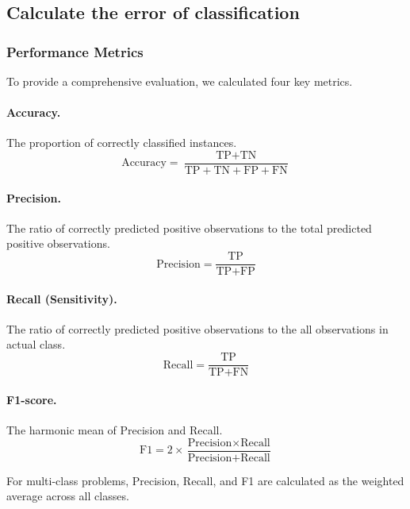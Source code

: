 \documentclass[12pt]{article}
\begin{document}
\subsection{Calculate the error of classification}

\subsubsection{Performance Metrics}
To provide a comprehensive evaluation, we calculated four key metrics.

\paragraph{Accuracy.} The proportion of correctly classified instances.
\begin{equation}
    \text{Accuracy} = \frac{\text{TP} + \text{TN}}{\text{TP} + \text{TN} + \text{FP} + \text{FN}}
\end{equation}

\paragraph{Precision.} The ratio of correctly predicted positive observations to the total predicted positive observations.
\begin{equation}
    \text{Precision} = \frac{\text{TP}}{\text{TP} + \text{FP}}
\end{equation}

\paragraph{Recall (Sensitivity).} The ratio of correctly predicted positive observations to the all observations in actual class.
\begin{equation}
    \text{Recall} = \frac{\text{TP}}{\text{TP} + \text{FN}}
\end{equation}

\paragraph{F1-score.} The harmonic mean of Precision and Recall.
\begin{equation}
    \text{F1} = 2 \times \frac{\text{Precision} \times \text{Recall}}{\text{Precision} + \text{Recall}}
\end{equation}

For multi-class problems, Precision, Recall, and F1 are calculated as the weighted average across all classes.
\end{document}
